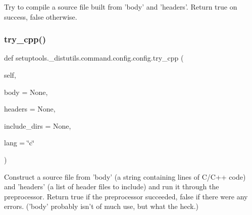 \begin{DoxyVerb}Try to compile a source file built from 'body' and 'headers'.
Return true on success, false otherwise.
\end{DoxyVerb}
 \mbox{\label{classsetuptools_1_1__distutils_1_1command_1_1config_1_1config_ae4c3306eb838dd726030348758bddddb}} 
\subsubsection{\texorpdfstring{try\+\_\+cpp()}{try\_cpp()}}
{\footnotesize\ttfamily def setuptools.\+\_\+distutils.\+command.\+config.\+config.\+try\+\_\+cpp (\begin{DoxyParamCaption}\item[{}]{self,  }\item[{}]{body = {\ttfamily None},  }\item[{}]{headers = {\ttfamily None},  }\item[{}]{include\+\_\+dirs = {\ttfamily None},  }\item[{}]{lang = {\ttfamily \char`\"{}c\char`\"{}} }\end{DoxyParamCaption})}

\begin{DoxyVerb}Construct a source file from 'body' (a string containing lines
of C/C++ code) and 'headers' (a list of header files to include)
and run it through the preprocessor.  Return true if the
preprocessor succeeded, false if there were any errors.
('body' probably isn't of much use, but what the heck.)
\end{DoxyVerb}
 \mbox{\label{classsetuptools_1_1__distutils_1_1command_1_1config_1_1config_a47745cfa2a87b0d2061dbe7af7c66612}} 
